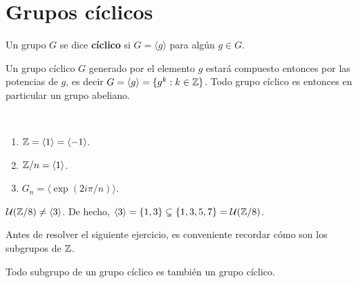 \chapter{Grupos cíclicos}
\label{orden}

\begin{definition}
	Un grupo $G$ se dice \textbf{cíclico} si $G=\langle g\rangle$ para algún
	$g\in G$.
\end{definition}

Un grupo cíclico $G$ generado por el elemento $g$ estará compuesto entonces por las potencias
de $g$, es decir $G=\langle g\rangle=\{g^k:k\in\mathbb{Z}\}$. Todo grupo cíclico es
entonces en particular un grupo abeliano.

\begin{examples}\
\begin{enumerate}
	\item $\mathbb{Z}=\langle 1\rangle=\langle -1\rangle$. 
	\item $\mathbb{Z}/n=\langle 1\rangle$.
	\item $G_n=\langle \exp(2i\pi/n)\rangle$.  
\end{enumerate}	
\end{examples}

\begin{example}
	$\mathcal{U}(\mathbb{Z}/8)\ne\langle 3\rangle$. De hecho, $\langle 3\rangle=\{1,3\}\subsetneq\{1,3,5,7\}=\mathcal{U}(\mathbb{Z}/8)$. 	
\end{example}

Antes de resolver el siguiente ejercicio, es conveniente recordar cómo son los subgrupos de $\mathbb{Z}$. 

\begin{exercise}
	Todo subgrupo de un grupo cíclico es también un grupo cíclico. 
\end{exercise}

%	


%	 
%	

